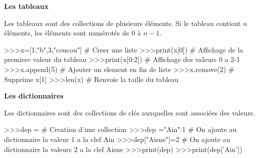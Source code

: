 \documentclass[11pt,oneside]{article}
\begin{document}
\begin{py}
\textbf{Les tableaux}

Les tableaux sont des collections de plusieurs éléments. Si le tableau contient $n$ éléments, les éléments sont numérotés de 0 à $n-1$.

\begin{python}
>>>x=[1,"b",3,"coucou"] # Creer une liste
>>>print(x[0]) # Affichage de la premiere valeur du tableau
>>>print(x[0:2]) # Affichage des valeurs 0 a 2-1
>>>x.append(5) # Ajouter un element en fin de liste
>>>x.remove(2) # Supprime x[1]
>>>len(x) # Renvoie la taille du tableau
\end{python}
\end{py}

\begin{py}
\textbf{Les dictionnaires}

Les dictionnaires sont des collections de clés auxquelles sont associées des valeurs.

\begin{python}
>>>dep = {} # Creation d'une collection
>>>dep ={"Ain":1} # On ajoute au dictionnaire la valeur 1 a la clef Ain 
>>>dep["Aisne"]=2 # On ajoute au dictionnaire la valeurs 2 a la clef Aisne
>>>print(dep) 
>>>print(dep['Ain'])
\end{python}
\end{py}


\end{document}
